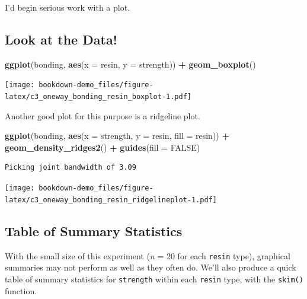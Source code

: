 \documentclass[]{book}
\newenvironment{Shaded}{\begin{snugshade}}{\end{snugshade}}
\newcommand{\KeywordTok}[1]{\textcolor[rgb]{0.13,0.29,0.53}{\textbf{#1}}}
\newcommand{\DataTypeTok}[1]{\textcolor[rgb]{0.13,0.29,0.53}{#1}}
\newcommand{\StringTok}[1]{\textcolor[rgb]{0.31,0.60,0.02}{#1}}
\newcommand{\OtherTok}[1]{\textcolor[rgb]{0.56,0.35,0.01}{#1}}
\newcommand{\OperatorTok}[1]{\textcolor[rgb]{0.81,0.36,0.00}{\textbf{#1}}}
\newcommand{\NormalTok}[1]{#1}
\theoremstyle{definition}
\theoremstyle{definition}
\theoremstyle{definition}
\theoremstyle{remark}
\begin{document}
I'd begin serious work with a plot.

\subsection{Look at the Data!}\label{look-at-the-data}

\begin{Shaded}
\begin{Highlighting}[]
\KeywordTok{ggplot}\NormalTok{(bonding, }\KeywordTok{aes}\NormalTok{(}\DataTypeTok{x =}\NormalTok{ resin, }\DataTypeTok{y =}\NormalTok{ strength)) }\OperatorTok{+}
\StringTok{    }\KeywordTok{geom_boxplot}\NormalTok{()}
\end{Highlighting}
\end{Shaded}

\texttt{[image: bookdown-demo\_files/figure-latex/c3\_oneway\_bonding\_resin\_boxplot-1.pdf]}

Another good plot for this purpose is a ridgeline plot.

\begin{Shaded}
\begin{Highlighting}[]
\KeywordTok{ggplot}\NormalTok{(bonding, }\KeywordTok{aes}\NormalTok{(}\DataTypeTok{x =}\NormalTok{ strength, }\DataTypeTok{y =}\NormalTok{ resin, }\DataTypeTok{fill =}\NormalTok{ resin)) }\OperatorTok{+}
\StringTok{    }\KeywordTok{geom_density_ridges2}\NormalTok{() }\OperatorTok{+}
\StringTok{    }\KeywordTok{guides}\NormalTok{(}\DataTypeTok{fill =} \OtherTok{FALSE}\NormalTok{)}
\end{Highlighting}
\end{Shaded}

\begin{verbatim}
Picking joint bandwidth of 3.09
\end{verbatim}

\texttt{[image: bookdown-demo\_files/figure-latex/c3\_oneway\_bonding\_resin\_ridgelineplot-1.pdf]}

\subsection{Table of Summary
Statistics}\label{table-of-summary-statistics}

With the small size of this experiment (\emph{n} = 20 for each
\texttt{resin} type), graphical summaries may not perform as well as
they often do. We'll also produce a quick table of summary statistics
for \texttt{strength} within each \texttt{resin} type, with the
\texttt{skim()} function.
\end{document}
